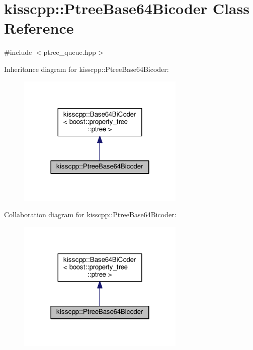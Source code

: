 \hypertarget{a00036}{\section{kisscpp\-:\-:Ptree\-Base64\-Bicoder Class Reference}
\label{a00036}
}


{\ttfamily \#include $<$ptree\-\_\-queue.\-hpp$>$}



Inheritance diagram for kisscpp\-:\-:Ptree\-Base64\-Bicoder\-:\nopagebreak
\begin{figure}[H]
\begin{center}
\leavevmode
\includegraphics[width=226pt]{a00157}
\end{center}
\end{figure}


Collaboration diagram for kisscpp\-:\-:Ptree\-Base64\-Bicoder\-:\nopagebreak
\begin{figure}[H]
\begin{center}
\leavevmode
\includegraphics[width=226pt]{a00158}
\end{center}
\end{figure}
